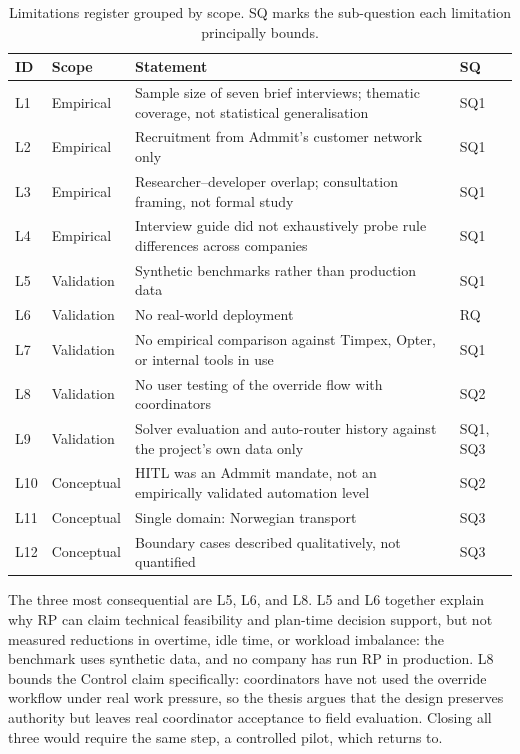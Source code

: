 \begin{table}[h]
\centering
\caption{Limitations register grouped by scope. SQ marks the sub-question each limitation principally bounds.}
\label{tab:limitations-register}
\small
\begin{tabular}{p{}p{}p{}p{}}
\toprule
\textbf{ID} & \textbf{Scope} & \textbf{Statement} & \textbf{SQ} \\
\midrule
L1  & Empirical    & Sample size of seven brief interviews; thematic coverage, not statistical generalisation & SQ1 \\
L2  & Empirical    & Recruitment from Admmit's customer network only                                          & SQ1 \\
L3  & Empirical    & Researcher--developer overlap; consultation framing, not formal study                    & SQ1 \\
L4  & Empirical    & Interview guide did not exhaustively probe rule differences across companies            & SQ1 \\
\midrule
L5  & Validation   & Synthetic benchmarks rather than production data                                         & SQ1 \\
L6  & Validation   & No real-world deployment                                                                 & RQ \\
L7  & Validation   & No empirical comparison against Timpex, Opter, or internal tools in use                  & SQ1 \\
L8  & Validation   & No user testing of the override flow with coordinators                                   & SQ2 \\
L9  & Validation   & Solver evaluation and auto-router history against the project's own data only            & SQ1, SQ3 \\
\midrule
L10 & Conceptual   & HITL was an Admmit mandate, not an empirically validated automation level                & SQ2 \\
L11 & Conceptual   & Single domain: Norwegian transport                                                       & SQ3 \\
L12 & Conceptual   & Boundary cases described qualitatively, not quantified                                   & SQ3 \\
\bottomrule
\end{tabular}
\end{table}

The three most consequential are L5, L6, and L8. L5 and L6 together explain why RP can claim technical feasibility and plan-time decision support, but not measured reductions in overtime, idle time, or workload imbalance: the benchmark uses synthetic data, and no company has run RP in production. L8 bounds the Control claim specifically: coordinators have not used the override workflow under real work pressure, so the thesis argues that the design preserves authority but leaves real coordinator acceptance to field evaluation. Closing all three would require the same step, a controlled pilot, which  returns to.


